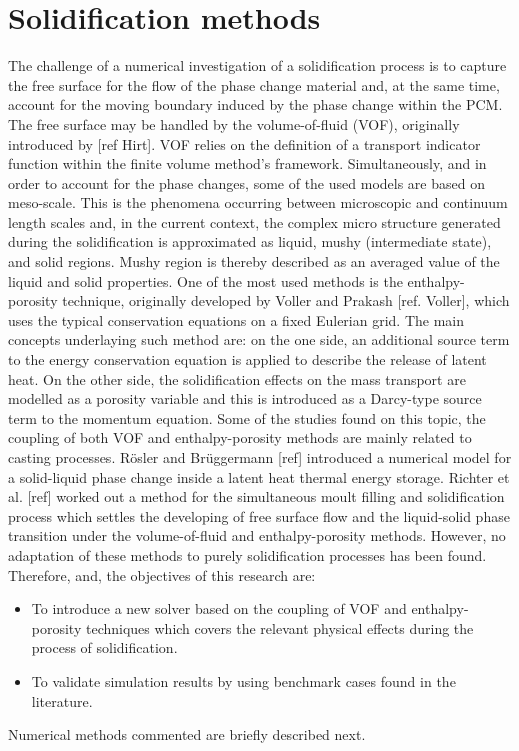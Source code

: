 \section{Solidification methods}
The challenge of a numerical investigation of a solidification process is to capture the free surface for the flow of the phase change material and, at the same time, account for the moving boundary induced by the phase change within the PCM. The free surface may be handled by the volume-of-fluid (VOF), originally introduced by [ref Hirt]. VOF relies on the definition of a transport indicator function within the finite volume method's framework.
Simultaneously, and in order to account for the phase changes, some of the used models are based on meso-scale. This is the phenomena occurring between microscopic and continuum length scales and, in the current context, the complex micro structure generated during the solidification is approximated as liquid, mushy (intermediate state), and solid regions. Mushy region is thereby described as an averaged value of the liquid and solid properties.
\newline
\indent One of the most used methods is the enthalpy-porosity technique, originally developed by Voller and Prakash [ref. Voller], which uses the typical conservation equations on a fixed Eulerian grid. The main concepts underlaying such method are: on the one side, an additional source term to the energy conservation equation is applied to describe the release of latent heat. On the other side, the solidification effects on the mass transport are modelled as a porosity variable and this is introduced as a Darcy-type source term to the momentum equation.
\newline
\indent Some of the studies found on this topic, the coupling of both VOF and enthalpy-porosity methods are mainly related to casting processes. Rösler and Brüggermann [ref] introduced a numerical model for a solid-liquid phase change inside a latent heat thermal energy storage. Richter et al. [ref] worked out a method for the simultaneous moult filling and solidification process which settles the developing of free surface flow and the liquid-solid phase transition under the volume-of-fluid and enthalpy-porosity methods.
However, no adaptation of these methods to purely solidification processes has been found. Therefore, and, the objectives of this research are:
\begin{itemize}
	\item To introduce a new solver based on the coupling of VOF and enthalpy-porosity techniques which covers the relevant physical effects during the process of solidification.
	\item	To validate simulation results by using benchmark cases found in the literature.
\end{itemize}
Numerical methods commented are briefly described next.


